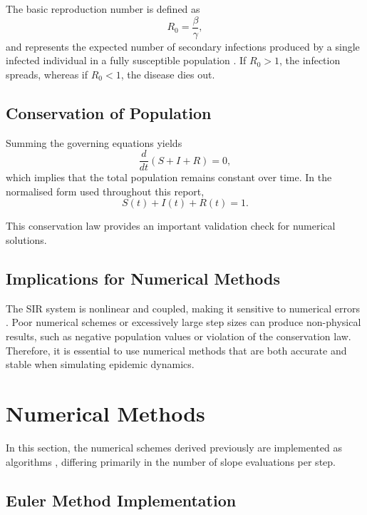 \documentclass{article}
\begin{document}
The basic reproduction number is defined as
\begin{equation}
R_0 = \frac{\beta}{\gamma},
\end{equation}
and represents the expected number of secondary infections produced by a single infected individual in a fully susceptible population \cite{7}. If $R_0 > 1$, the infection spreads, whereas if $R_0 < 1$, the disease dies out.

\subsection{Conservation of Population}

Summing the governing equations yields
\begin{equation}
\frac{d}{dt}(S+I+R) = 0,
\end{equation}
which implies that the total population remains constant over time. In the normalised form used throughout this report,
\begin{equation}
S(t) + I(t) + R(t) = 1.
\end{equation}

This conservation law provides an important validation check for numerical solutions.

\subsection{Implications for Numerical Methods}

The SIR system is nonlinear and coupled, making it sensitive to numerical errors \cite{19}. Poor numerical schemes or excessively large step sizes can produce non-physical results, such as negative population values or violation of the conservation law. Therefore, it is essential to use numerical methods that are both accurate and stable when simulating epidemic dynamics.

\section{Numerical Methods}

In this section, the numerical schemes derived previously are implemented as algorithms \cite{3}, differing primarily in the number of slope evaluations per step.

\subsection{Euler Method Implementation}
\end{document}
